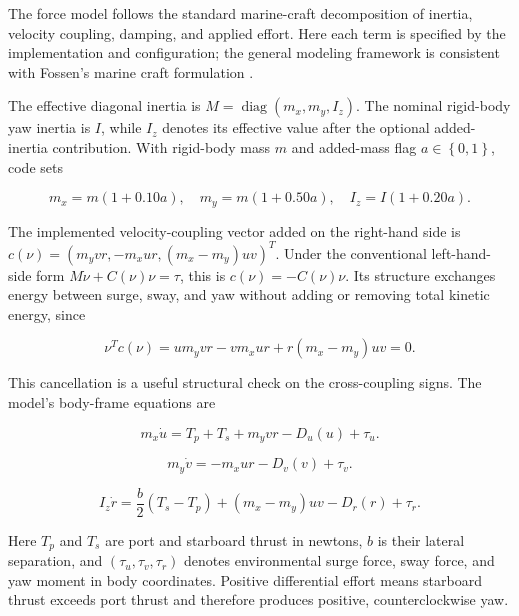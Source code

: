 \documentclass[10pt,letterpaper]{article}
\begin{document}
The force model follows the standard marine-craft decomposition of inertia, velocity coupling, damping, and applied effort. Here each term is specified by the implementation and configuration; the general modeling framework is consistent with Fossen's marine craft formulation \cite{Fossen2026MarineModel}.

The effective diagonal inertia is \(M = \operatorname{diag}\left( m_{x},m_{y},I_{z} \right)\). The nominal rigid-body yaw inertia is \(I\), while \(I_{z}\) denotes its effective value after the optional added-inertia contribution. With rigid-body mass \(m\) and added-mass flag \(a \in \left\{ 0,1 \right\}\), code sets

\begin{equation}
m_{x} = m(1 + 0.10a),\quad m_{y} = m(1 + 0.50a),\quad I_{z} = I(1 + 0.20a).
\end{equation}

The implemented velocity-coupling vector added on the right-hand side is \(c(\nu) = \left( m_{y}vr, - m_{x}ur,\left( m_{x} - m_{y} \right)uv \right)^{T}\). Under the conventional left-hand-side form \(M\dot{\nu} + C(\nu)\nu = \tau\), this is \(c(\nu) = - C(\nu)\nu\). Its structure exchanges energy between surge, sway, and yaw without adding or removing total kinetic energy, since

\begin{equation}
\nu^{T}c(\nu) = um_{y}vr - vm_{x}ur + r\left( m_{x} - m_{y} \right)uv = 0.
\end{equation}

This cancellation is a useful structural check on the cross-coupling signs. The model's body-frame equations are

\begin{equation}
m_{x}\dot{u} = T_{p} + T_{s} + m_{y}vr - D_{u}(u) + \tau_{u}.
\end{equation}

\begin{equation}
m_{y}\dot{v} = - m_{x}ur - D_{v}(v) + \tau_{v}.
\end{equation}

\begin{equation}
I_{z}\dot{r} = \frac{b}{2}\left( T_{s} - T_{p} \right) + \left( m_{x} - m_{y} \right)uv - D_{r}(r) + \tau_{r}.
\end{equation}

Here \(T_{p}\) and \(T_{s}\) are port and starboard thrust in newtons, \(b\) is their lateral separation, and \(\left( \tau_{u},\tau_{v},\tau_{r} \right)\) denotes environmental surge force, sway force, and yaw moment in body coordinates. Positive differential effort means starboard thrust exceeds port thrust and therefore produces positive, counterclockwise yaw.
\end{document}
